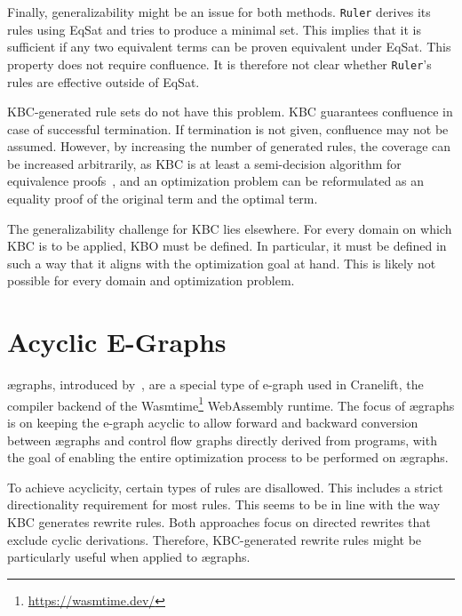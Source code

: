 Finally, generalizability might be an issue for both methods. \texttt{Ruler} derives its rules using EqSat and tries to produce a minimal set. This implies that it is sufficient if any two equivalent terms can be proven equivalent under EqSat. This property does not require confluence. It is therefore not clear whether \texttt{Ruler}'s rules are effective outside of EqSat.

KBC-generated rule sets do not have this problem. KBC guarantees confluence in case of successful termination. If termination is not given, confluence may not be assumed. However, by increasing the number of generated rules, the coverage can be increased arbitrarily, as KBC is at least a semi-decision algorithm for equivalence proofs~\citep{10.1093/comjnl/34.1.2}, and an optimization problem can be reformulated as an equality proof of the original term and the optimal term.

The generalizability challenge for KBC lies elsewhere. For every domain on which KBC is to be applied, KBO must be defined. In particular, it must be defined in such a way that it aligns with the optimization goal at hand. This is likely not possible for every domain and optimization problem. 

\section{Acyclic E-Graphs}
ægraphs, introduced by~\cite{Fallin2023_aEGraphs}, are a special type of e-graph used in Cranelift, the compiler backend of the Wasmtime\footnote{\url{https://wasmtime.dev/}} WebAssembly runtime. The focus of ægraphs is on keeping the e-graph acyclic to allow forward and backward conversion between ægraphs and control flow graphs directly derived from programs, with the goal of enabling the entire optimization process to be performed on ægraphs.

To achieve acyclicity, certain types of rules are disallowed. This includes a strict directionality requirement for most rules. This seems to be in line with the way KBC generates rewrite rules. Both approaches focus on directed rewrites that exclude cyclic derivations. Therefore, KBC-generated rewrite rules might be particularly useful when applied to ægraphs.
